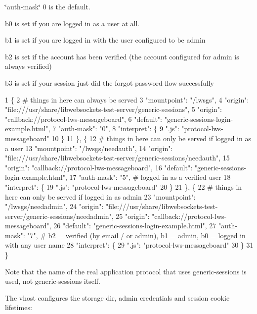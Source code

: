 \char`\"{}auth-\/mask\char`\"{} 0 is the default.


\begin{DoxyItemize}
\item b0 is set if you are logged in as a user at all.
\item b1 is set if you are logged in with the user configured to be admin
\item b2 is set if the account has been verified (the account configured for admin is always verified)
\item b3 is set if your session just did the forgot password flow successfully
\end{DoxyItemize}


\begin{DoxyCode}
1 \{
2   # things in here can always be served
3   "mountpoint": "/lwsgs",
4   "origin": "file:///usr/share/libwebsockets-test-server/generic-sessions",
5   "origin": "callback://protocol-lws-messageboard",
6   "default": "generic-sessions-login-example.html",
7   "auth-mask": "0",
8   "interpret": \{
9           ".js": "protocol-lws-messageboard"
10   \}
11  \}, \{
12   # things in here can only be served if logged in as a user
13   "mountpoint": "/lwsgs/needauth",
14   "origin": "file:///usr/share/libwebsockets-test-server/generic-sessions/needauth",
15   "origin": "callback://protocol-lws-messageboard",
16   "default": "generic-sessions-login-example.html",
17   "auth-mask": "5", # logged in as a verified user
18   "interpret": \{
19           ".js": "protocol-lws-messageboard"
20   \}
21  \}, \{
22   # things in here can only be served if logged in as admin
23   "mountpoint": "/lwsgs/needadmin",
24   "origin": "file:///usr/share/libwebsockets-test-server/generic-sessions/needadmin",
25   "origin": "callback://protocol-lws-messageboard",
26   "default": "generic-sessions-login-example.html",
27   "auth-mask": "7", # b2 = verified (by email / or admin), b1 = admin, b0 = logged in with any user name
28   "interpret": \{
29           ".js": "protocol-lws-messageboard"
30   \}
31  \}
\end{DoxyCode}
 Note that the name of the real application protocol that uses generic-\/sessions is used, not generic-\/sessions itself.

The vhost configures the storage dir, admin credentials and session cookie lifetimes\+:


